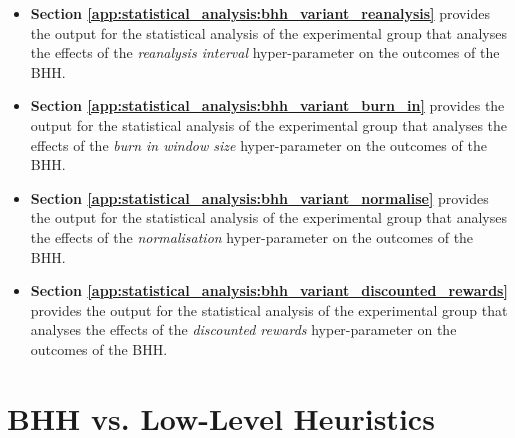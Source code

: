 \begin{itemize}
	\item \textbf{Section \ref{app:statistical_analysis:bhh_variant_reanalysis}} provides the output for the statistical analysis of the experimental group that analyses the effects of the \textit{reanalysis interval} hyper-parameter on the outcomes of the \acs{BHH}.

	\item \textbf{Section \ref{app:statistical_analysis:bhh_variant_burn_in}} provides the output for the statistical analysis of the experimental group that analyses the effects of the \textit{burn in window size} hyper-parameter on the outcomes of the \acs{BHH}.

	\item \textbf{Section \ref{app:statistical_analysis:bhh_variant_normalise}} provides the output for the statistical analysis of the experimental group that analyses the effects of the \textit{normalisation} hyper-parameter on the outcomes of the \acs{BHH}.

	\item \textbf{Section \ref{app:statistical_analysis:bhh_variant_discounted_rewards}} provides the output for the statistical analysis of the experimental group that analyses the effects of the \textit{discounted rewards} hyper-parameter on the outcomes of the \acs{BHH}.
\end{itemize}

\section{BHH vs. Low-Level Heuristics}\label{app:statistical_analysis:bhh_vs_low_level_heuristics}

\begin{table}[H]
	\centering
	\caption{ANOVA - Rank - BHH vs. Low-Level Heuristics}
	\label{tab:results:standalone:anova}%
	\par\bigskip
\end{table}


